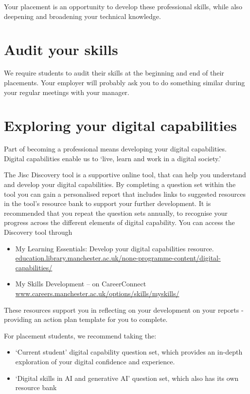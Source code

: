 \documentclass[
]{book}
\providecommand{\tightlist}{%
  \setlength{\itemsep}{0pt}\setlength{\parskip}{0pt}}
\begin{document}
Your placement is an opportunity to develop these professional skills, while also deepening and broadening your technical knowledge.

\section{Audit your skills}\label{Audit}

We require students to audit their skills at the beginning and end of their placements. Your employer will probably ask you to do something similar during your regular meetings with your manager.

\section{Exploring your digital capabilities}\label{digital}

Part of becoming a professional means developing your digital capabilities. Digital capabilities enable us to `live, learn and work in a digital society.'

The Jisc Discovery tool is a supportive online tool, that can help you understand and develop your digital capabilities. By completing a question set within the tool you can gain a personalised report that includes
links to suggested resources in the tool's resource bank to support your further development. It is recommended that you repeat the question sets annually, to recognise your progress across the different elements of digital capability. You can access the Discovery tool through

\begin{itemize}
\tightlist
\item
  My Learning Essentials: Develop your digital capabilities resource. \href{https://www.education.library.manchester.ac.uk/none-programme-content/digital-capabilities/}{education.library.manchester.ac.uk/none-programme-content/digital-capabilities/}
\item
  My Skills Development -- on CareerConnect \href{https://www.careers.manchester.ac.uk/options/skills/myskills/}{www.careers.manchester.ac.uk/options/skills/myskills/} \citep{audit}
\end{itemize}

These resources support you in reflecting on your development on your reports - providing an action plan template for you to complete.

For placement students, we recommend taking the:

\begin{itemize}
\tightlist
\item
  `Current student' digital capability question set, which provides an in-depth exploration of your digital confidence and experience.
\item
  `Digital skills in AI and generative AI' question set, which also has its own resource bank
\end{itemize}
\end{document}
